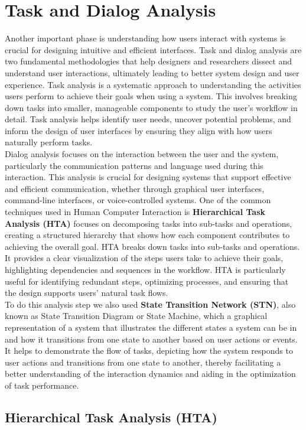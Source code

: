 \section{Task and Dialog Analysis}
Another important phase is understanding how users interact with systems is crucial for designing intuitive and efficient interfaces. Task and dialog analysis are two fundamental methodologies that help designers and researchers dissect and understand user interactions, ultimately leading to better system design and user experience. Task analysis is a systematic approach to understanding the activities users perform to achieve their goals when using a system. This involves breaking down tasks into smaller, manageable components to study the user's workflow in detail. Task analysis helps identify user needs, uncover potential problems, and inform the design of user interfaces by ensuring they align with how users naturally perform tasks.\\
Dialog analysis focuses on the interaction between the user and the system, particularly the communication patterns and language used during this interaction. This analysis is crucial for designing systems that support effective and efficient communication, whether through graphical user interfaces, command-line interfaces, or voice-controlled systems.
One of the common techniques used in Human Computer Interaction is \textbf{Hierarchical Task Analysis (HTA)} focuses on decomposing tasks into sub-tasks and operations, creating a structured hierarchy that shows how each component contributes to achieving the overall goal. HTA breaks down tasks into sub-tasks and operations. It provides a clear visualization of the steps users take to achieve their goals, highlighting dependencies and sequences in the workflow. HTA is particularly useful for identifying redundant steps, optimizing processes, and ensuring that the design supports users' natural task flows.\\
To do this analysis step we also used \textbf{State Transition Network (STN)}, also known as State Transition Diagram or State Machine, which a graphical representation of a system that illustrates the different states a system can be in and how it transitions from one state to another based on user actions or events. It helps to demonstrate the flow of tasks, depicting how the system responds to user actions and transitions from one state to another, thereby facilitating a better understanding of the interaction dynamics and aiding in the optimization of task performance.
\subsection{Hierarchical Task Analysis (HTA)}

